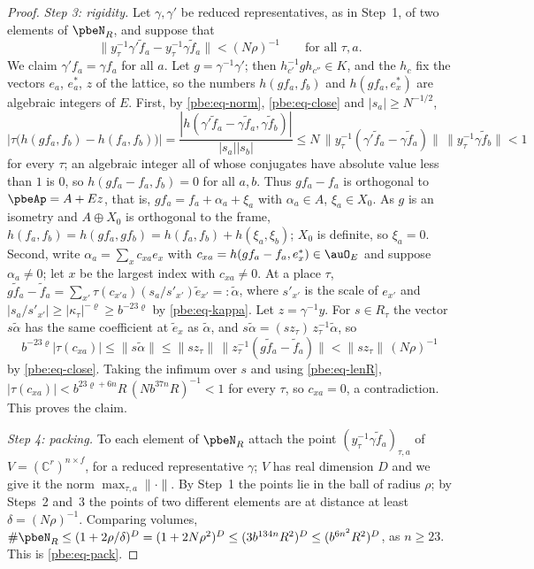 \documentclass[10pt]{amsart}
\theoremstyle{definition}
\theoremstyle{remark}
\newcommand{\C}{\mathbb C}
\begin{document}
\begin{proof}
\emph{Step 3: rigidity.} Let $\gamma,\gamma'$ be reduced representatives, as in Step~1, of two
elements of $\pbeN_R$, and suppose that
\begin{equation}\label{pbe:eq-close}
\|y_\tau^{-1}\gamma'\tilde f_a-y_\tau^{-1}\gamma\tilde f_a\|<(N\rho)^{-1}\qquad\text{for all }\tau,a .
\end{equation}
We claim $\gamma'f_a=\gamma f_a$ for all $a$. Let $g=\gamma^{-1}\gamma'$; then $h_{c'}^{-1}gh_{c''}\in
K$, and the $h_c$ fix the vectors $e_a$, $e_a^*$, $z$ of the lattice, so the numbers $h(gf_a,f_b)$
and $h(gf_a,e_x^*)$ are algebraic integers of $E$. First, by \eqref{pbe:eq-norm}, \eqref{pbe:eq-close}
and $|s_a|\ge N^{-1/2}$,
\[
\bigl|\tau\bigl(h(gf_a,f_b)-h(f_a,f_b)\bigr)\bigr|=\frac{|h(\gamma'\tilde f_a-\gamma\tilde f_a,\gamma
\tilde f_b)|}{|s_a||s_b|}\le N\,\|y_\tau^{-1}(\gamma'\tilde f_a-\gamma\tilde f_a)\|\,\|y_\tau^{-1}
\gamma\tilde f_b\|<1
\]
for every $\tau$; an algebraic integer all of whose conjugates have absolute value less than $1$ is
$0$, so $h(gf_a-f_a,f_b)=0$ for all $a,b$. Thus $gf_a-f_a$ is orthogonal to $\pbeAp=A+Ez$, that is,
$gf_a=f_a+\alpha_a+\xi_a$ with $\alpha_a\in A$, $\xi_a\in X_0$. As $g$ is an isometry and $A\oplus
X_0$ is orthogonal to the frame, $h(f_a,f_b)=h(gf_a,gf_b)=h(f_a,f_b)+h(\xi_a,\xi_b)$; $X_0$ is
definite, so $\xi_a=0$. Second, write $\alpha_a=\sum_xc_{xa}e_x$ with $c_{xa}=h(gf_a-f_a,e_x^*)\in\auO_E$
and suppose $\alpha_a\ne0$; let $x$ be the largest index with $c_{xa}\ne0$. At a place $\tau$,
$g\tilde f_a-\tilde f_a=\sum_{x'}\tau(c_{x'a})(s_a/s'_{x'})\tilde e_{x'}=:\tilde\alpha$, where
$s'_{x'}$ is the scale of $e_{x'}$ and $|s_a/s'_{x'}|\ge|\kappa_\tau|^{-\varrho}\ge b^{-23\varrho}$
by \eqref{pbe:eq-kappa}. Let $z=\gamma^{-1}y$. For $s\in R_\tau$ the vector $s\tilde\alpha$ has
the same coefficient at $\tilde e_x$ as $\tilde\alpha$, and $s\tilde\alpha=(sz_\tau)\,z_\tau^{-1}\tilde
\alpha$, so
\[
b^{-23\varrho}|\tau(c_{xa})|\le\|s\tilde\alpha\|\le\|sz_\tau\|\,\|z_\tau^{-1}(g\tilde f_a-\tilde f_a)\|
<\|sz_\tau\|\,(N\rho)^{-1}
\]
by \eqref{pbe:eq-close}. Taking the infimum over $s$ and using \eqref{pbe:eq-lenR}, $|\tau(c_{xa})|<
b^{23\varrho+6n}R\,(Nb^{37n}R)^{-1}<1$ for every $\tau$, so $c_{xa}=0$, a contradiction. This proves
the claim.

\emph{Step 4: packing.} To each element of $\pbeN_R$ attach the point $(y_\tau^{-1}\gamma\tilde f_a)_{
\tau,a}$ of $V=(\C^r)^{n\times f}$, for a reduced representative $\gamma$; $V$ has real dimension
$D$ and we give it the norm $\max_{\tau,a}\|\cdot\|$. By Step~1 the points lie in the ball of radius
$\rho$; by Steps~2 and~3 the points of two different elements are at distance at least $\delta=(N
\rho)^{-1}$. Comparing volumes, $\#\pbeN_R\le(1+2\rho/\delta)^D=(1+2N\rho^2)^D\le(3b^{134n}R^2)^D
\le(b^{6n^2}R^2)^D$, as $n\ge23$. This is \eqref{pbe:eq-pack}.
\end{proof}
\end{document}
